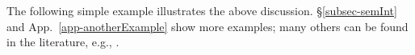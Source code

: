 
%

The following 
simple example %
illustrates the above discussion. \S\ref{subsec-semInt} and App.~\ref{app-anotherExample} show  %
more %
examples;  
many others can be found in the literature, 
e.g.,  \cite{primrecFOAS-Norrish04,pitts-AlphaStructural,DBLP:conf/icfp/PopescuG11}. 


